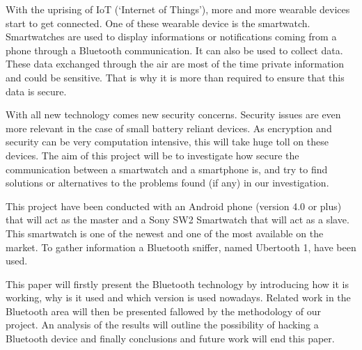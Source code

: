 
With the uprising of IoT (‘Internet of Things’), more and more wearable devices start to get connected. One of these wearable device is the smartwatch. Smartwatches are used to display informations or notifications coming from a phone through a Bluetooth communication. It can also be used to collect data. These data exchanged through the air are most of the time private information and could be sensitive. That is why it is more than required to ensure that this data is secure.

With all new technology comes new security concerns. Security issues are even more relevant in the case of small battery reliant devices. As encryption and security can be very computation intensive, this will take huge toll on these devices. The aim of this project will be to investigate how secure the communication between a smartwatch and a smartphone is, and try to find solutions or alternatives to the problems found (if any) in our investigation.

This project have been conducted with an Android phone (version 4.0 or plus) that will act as the master and a Sony SW2 Smartwatch that will act as a slave. This smartwatch is one of the newest and one of the most available on the market. To gather information a Bluetooth sniffer, named Ubertooth 1, have been used.

This paper will firstly present the Bluetooth technology by introducing how it is working, why is it used and which version is used nowadays. Related work in the Bluetooth area will then be presented fallowed by the methodology of our project. An analysis of the results will outline the possibility of hacking a Bluetooth device and finally conclusions and future work will end this paper.